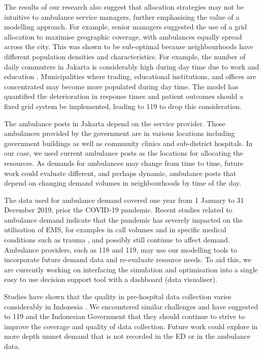 \documentclass[numbers,webpdf,imaman]{ima-authoring-template}%
\begin{document}
The results of our research also suggest that allocation strategies may not be
intuitive to ambulance service managers, further emphasising the value of a
modelling approach. For example, senior managers suggested the use of a grid
allocation to maximise geographic coverage, with ambulances equally spread
across the city. This was shown to be sub-optimal because neighbourhoods have
different population densities and characteristics. For example, the number of
daily commuters in Jakarta is considerably high during day time due to work
and education \citep{BPS_Jakarta_migrasi}. Municipalities where trading,
educational institutions, and offices are concentrated may become more
populated during day time. The model has quantified the deterioration in
response times and patient outcomes should a fixed grid system be implemented,
leading to 119 to drop this consideration.

The ambulance posts in Jakarta depend on the service provider. Those
ambulances provided by the government are in various locations including
government buildings as well as community clinics and sub-district hospitals.
In our case, we used current ambulance posts as the locations for allocating
the resources. As demands for ambulances may change from time to time, future
work could evaluate different, and perhaps dynamic, ambulance posts that
depend on changing demand volumes in neighbourhoods by time of the day.

The data used for ambulance demand covered one year from 1 January to 31
December 2019, prior the COVID-19 pandemic. Recent studies related to
ambulance demand indicate that the  pandemic has severely impacted on the
utilisation of EMS, for examples in call volumes \citep{csan2021effects} and in
specific medical conditions such as trauma \citep{azbel2021effects}, and
possibly still continue to affect demand. Ambulance providers, such as 118 and
119, may use our modelling tools to incorporate future demand data and
re-evaluate resource needs. To aid this, we are currently working on
interfacing the simulation and optimisation into a single easy to use decision
support tool with a dashboard (data visualiser). 

Studies have shown that the quality in pre-hospital data collection varies
considerably in Indonesia \citep{hooper2019_datacollection}. We encountered
similar challenges and have suggested to 119 and the Indonesian Government
that they should continue to strive to improve the coverage and quality of
data collection. Future work could explore in more depth unmet demand that is
not recorded in the ED or in the ambulance data.
\end{document}
